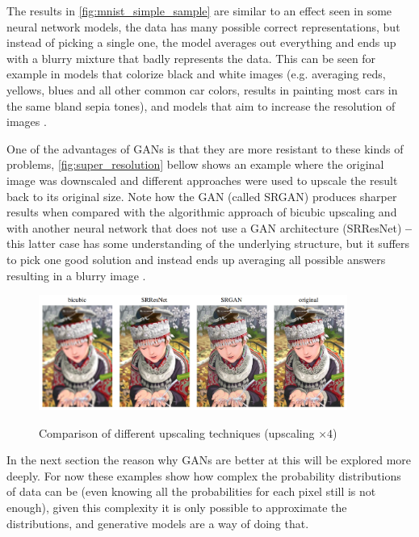 The results in \autoref{fig:mnist_simple_sample} are similar to an effect seen in some neural network models, the data has many possible correct representations, but instead of picking a single one, the model averages out everything and ends up with a blurry mixture that badly represents the data. This can be seen for example in models that colorize black and white images \cite{automaticColorization2016} (e.g. averaging reds, yellows, blues and all other common car colors, results in painting most cars in the same bland sepia tones), and models that aim to increase the resolution of images \cite{ganSuperResolution2016}.

One of the advantages of \acp{GAN} is that they are more resistant to these kinds of problems, \autoref{fig:super_resolution} bellow shows an example where the original image was downscaled and different approaches were used to upscale the result back to its original size. Note how the \gls{GAN} (called SRGAN) produces sharper results when compared with the algorithmic approach of bicubic upscaling and with another neural network that does not use a \gls{GAN} architecture (SRResNet) \textbf{--} this latter case has some understanding of the underlying structure, but it suffers to pick one good solution and instead ends up averaging all possible answers resulting in a blurry image \cite{nipsGAN2017}.
\begin{figure}[hbt]
    \centering
    \caption{Comparison of different upscaling techniques (upscaling $\times4$)}
    \includegraphics[width=0.9\textwidth]{chapters/GANs/figures/superResolution.png}
    \label{fig:super_resolution}
\end{figure}

In the next section the reason why \acp{GAN} are better at this will be explored more deeply. For now these examples show how complex the probability distributions of data can be (even knowing all the probabilities for each pixel still is not enough), given this complexity it is only possible to approximate the distributions, and generative models are a way of doing that.

